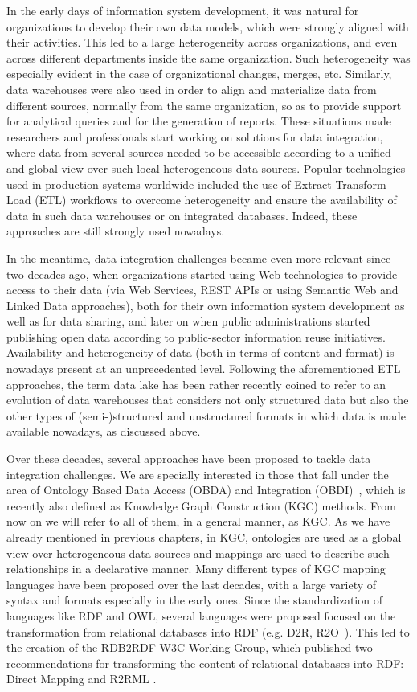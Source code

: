 In the early days of information system development, it was natural for organizations to develop their own data models, which were strongly aligned with their activities. This led to a large heterogeneity across organizations, and even across different departments inside the same organization. Such heterogeneity was especially evident in the case of organizational changes, merges, etc. Similarly, data warehouses were also used in order to align and materialize data from different sources, normally from the same organization, so as to provide support for analytical queries and for the generation of reports. These situations made researchers and professionals start working on solutions for data integration, where data from several sources needed to be accessible according to a unified and global view over such local heterogeneous data sources. Popular technologies used in production systems worldwide included the use of Extract-Transform-Load (ETL) workflows to overcome heterogeneity and ensure the availability of data in such data warehouses or on integrated databases. Indeed, these approaches are still strongly used nowadays.

In the meantime, data integration challenges became even more relevant since two decades ago, when organizations started using Web technologies to provide access to their data (via Web Services, REST APIs or using Semantic Web and Linked Data approaches), both for their own information system development as well as for data sharing, and later on when public administrations started publishing open data according to  public-sector information reuse initiatives. Availability and heterogeneity of data (both in terms of content and format) is nowadays present at an unprecedented level. Following the aforementioned ETL approaches, the term data lake has been rather recently coined to refer to an evolution of data warehouses that considers not only structured data but also the other types of (semi-)structured and unstructured formats in which data is made available nowadays, as discussed above.

Over these decades, several approaches have been proposed to tackle data integration challenges. We are specially interested in those that fall under the area of Ontology Based Data Access (OBDA) and Integration (OBDI)~\citep{poggi2008linking}, which is recently also defined as Knowledge Graph Construction (KGC) methods. From now on we will refer to all of them, in a general manner, as KGC. As we have already mentioned in previous chapters, in KGC, ontologies are used as a global view over heterogeneous data sources and mappings are used to describe such relationships in a declarative manner. Many different types of KGC mapping languages have been proposed over the last decades, with a large variety of syntax and formats especially in the early ones. Since the standardization of languages like RDF and OWL, several languages were proposed focused on the transformation from relational databases into RDF (e.g. D2R, R2O~\citep{barrasa2004r2o}). This led to the creation of the RDB2RDF W3C Working Group, which published two recommendations for transforming the content of relational databases into RDF: Direct Mapping \citep{arenas2013direct} and R2RML \citep{R2RML}.

